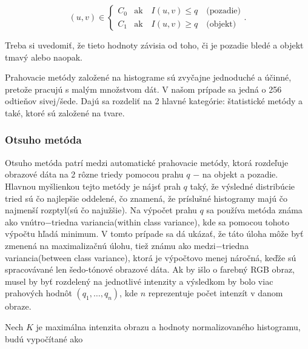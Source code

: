 \documentclass[a4paper,11pt,twoside]{article}%
\begin{document}
\begin{equation}
(u, v) \in \begin{cases} C_0 & \text{ak} \hspace{1em} I(u,v) \leq q \hspace{1em} \text{(pozadie)} \\  C_1 & \text{ak} \hspace{1em} I(u,v) \geq q \hspace{1em} \text{(objekt)} \end{cases}.
\end{equation}

Treba si uvedomiť, že tieto hodnoty závisia od toho, či je pozadie bledé a objekt tmavý alebo naopak.

Prahovacie metódy založené na histograme sú zvyčajne jednoduché a účinné, pretože pracujú s malým množstvom dát. V našom prípade sa jedná o 256 odtieňov sivej/šede. Dajú sa rozdeliť na 2 hlavné kategórie: štatistické metódy a také, ktoré sú založené na tvare.


\subsubsection{Otsuho metóda}
Otsuho metóda patrí medzi automatické  prahovacie metódy, ktorá rozdeľuje obrazové dáta na 2 rôzne triedy pomocou prahu $q$ $-$ na objekt a pozadie. Hlavnou myšlienkou tejto metódy je nájsť prah $q$ taký, že výsledné distribúcie tried sú čo najlepšie oddelené, čo znamená, že príslušné histogramy majú čo najmenší rozptyl(sú čo najužšie). Na výpočet prahu $q$ sa používa metóda známa ako vnútro$-$triedna variancia(within class variance), kde sa pomocou tohoto výpočtu hľadá minimum. V tomto prípade sa dá ukázať, že táto úloha môže byť zmenená na maximalizačnú úlohu, tiež známu ako medzi$-$triedna variancia(between class variance), ktorá je výpočtovo menej náročná, keďže sú spracovávané len šedo-tónové obrazové dáta. Ak by išlo o farebný RGB obraz, musel by byť rozdelený na jednotlivé intenzity a výsledkom by bolo viac prahových hodnôt $(q_1, \ldots, q_n)$, kde $n$ reprezentuje počet intenzít v danom obraze.

Nech $K$ je maximálna intenzita obrazu a hodnoty normalizovaného histogramu, budú vypočítané ako
\end{document}
